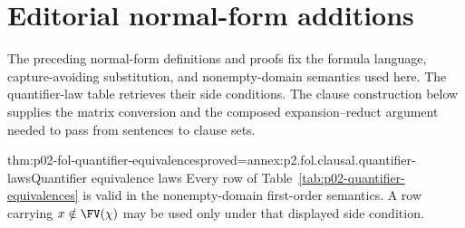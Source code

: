 \section*{Editorial normal-form additions}
The preceding normal-form definitions and proofs fix the formula language,
capture-avoiding substitution, and nonempty-domain semantics used here.
The quantifier-law table retrieves their side conditions.  The clause
construction below supplies the matrix conversion and the composed
expansion--reduct argument needed to pass from sentences to clause sets.

\begin{hbtheorem}{thm:p02-fol-quantifier-equivalences}{proved=annex:p2.fol.clausal.quantifier-laws}{Quantifier equivalence laws}
Every row of Table~\ref{tab:p02-quantifier-equivalences} is valid in the
nonempty-domain first-order semantics.  A row carrying
\(x\notin\FV(\chi)\) may be used only under that displayed side condition.
\end{hbtheorem}

